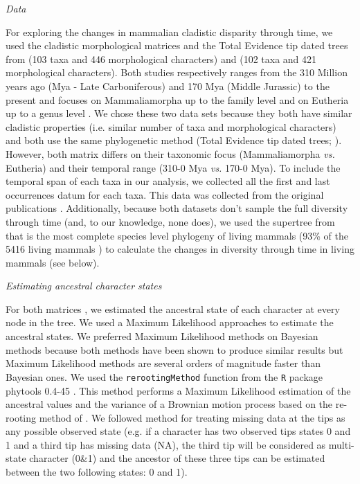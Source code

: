 \documentclass[12pt,letterpaper]{article}
\renewcommand{\subsection}[1]{%
\bigskip
\begin{center}
\begin{large}
\normalfont\itshape #1
\end{large}
\end{center}}
\begin{document}
\subsection{Data}
For exploring the changes in mammalian cladistic disparity through time, we used the cladistic morphological matrices and the Total Evidence tip dated trees \citep{ronquista2012} from \cite{MEE3:MEE312084} (103 taxa and 446 morphological characters) and \cite{beckancient2014} (102 taxa and 421 morphological characters). Both studies respectively ranges from the 310 Million years ago (Mya - Late Carboniferous) and 170 Mya (Middle Jurassic) to the present and focuses on Mammaliamorpha up to the family level \cite{MEE3:MEE312084} and on Eutheria up to a genus level \cite{beckancient2014}. We chose these two data sets because they both have similar cladistic properties (i.e. similar number of taxa and morphological characters) and both use the same phylogenetic method (Total Evidence tip dated trees; \citealt{ronquista2012}). However, both matrix differs on their taxonomic focus (Mammaliamorpha \textit{vs.} Eutheria) and their temporal range (310-0 Mya \textit{vs.} 170-0 Mya). To include the temporal span of each taxa in our analysis, we collected all the first and last occurrences datum for each taxa. This data was collected from the original publications \citep{MEE3:MEE312084,beckancient2014}. Additionally, because both datasets don't sample the full diversity through time (and, to our knowledge, none does), we used the supertree from \cite{fritzdiversity2013} that is the most complete species level phylogeny of living mammals (93\% of the 5416 living mammals \cite{wilson2005mammal}) to calculate the changes in diversity through time in living mammals (see below).

\subsection{Estimating ancestral character states}
For both matrices \citep{MEE3:MEE312084,beckancient2014}, we estimated the ancestral state of each character at every node in the tree. We used a Maximum Likelihood approaches to estimate the ancestral states. We preferred Maximum Likelihood methods on Bayesian methods because both methods have been shown to produce similar results \cite{royer-carenzichoosing2013} but Maximum Likelihood methods are several orders of magnitude faster than Bayesian ones. We used the \texttt{rerootingMethod} function from the \texttt{R} package phytools 0.4-45 \citep{phytools}. This method performs a Maximum Likelihood estimation of the ancestral values and the variance of a Brownian motion process based on the re-rooting method of \cite{Yang01121995}. We followed \cite{Claddis} method for treating missing data at the tips as any possible observed state (e.g. if a character has two observed tips states 0 and 1 and a third tip has missing data (NA), the third tip will be considered as multi-state character (0\&1) and the ancestor of these three tips can be estimated between the two following states: 0 and 1).
\end{document}
